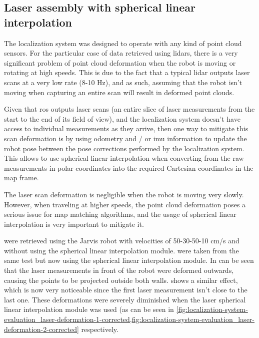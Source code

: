\subsection{Laser assembly with spherical linear interpolation}

The localization system was designed to operate with any kind of point cloud sensors. For the particular case of data retrieved using \glspl{lidar}, there is a very significant problem of point cloud deformation when the robot is moving or rotating at high speeds. This is due to the fact that a typical \gls{lidar} outputs laser scans at a very low rate (8-10 Hz), and as such, assuming that the robot isn't moving when capturing an entire scan will result in deformed point clouds.

Given that \gls{ros} outputs laser scans (an entire slice of laser measurements from the start to the end of its field of view), and the localization system doesn't have access to individual measurements as they arrive, then one way to mitigate this scan deformation is by using odometry and / or \gls{imu} information to update the robot pose between the pose corrections performed by the localization system. This allows to use spherical linear interpolation when converting from the raw measurements in polar coordinates into the required Cartesian coordinates in the map frame.

The laser scan deformation is negligible when the robot is moving very slowly. However, when traveling at higher speeds, the point cloud deformation poses a serious issue for map matching algorithms, and the usage of spherical linear interpolation is very important to mitigate it.

 were retrieved using the Jarvis robot with velocities of 50-30-50-10 cm/s and without using the spherical linear interpolation module.  were taken from the same test but now using the spherical linear interpolation module. In  can be seen that the laser measurements in front of the robot were deformed outwards, causing the points to be projected outside both walls.  shows a similar effect, which is now very noticeable since the first laser measurement isn't close to the last one. These deformations were severely diminished when the laser spherical linear interpolation module was used (as can be seen in \cref{fig:localization-system-evaluation_laser-deformation-1-corrected,fig:localization-system-evaluation_laser-deformation-2-corrected} respectively.

